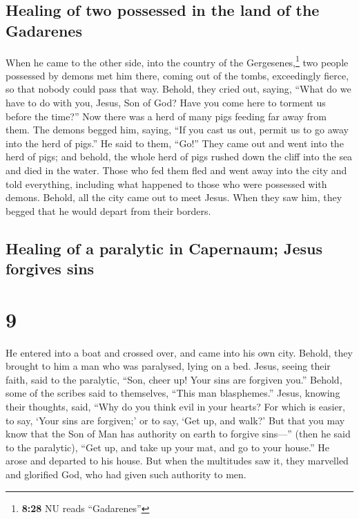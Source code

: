 \hypertarget{healing-of-two-possessed-in-the-land-of-the-gadarenes}{%
\subsection{Healing of two possessed in the land of the
Gadarenes}\label{healing-of-two-possessed-in-the-land-of-the-gadarenes}}

 When he came to the other side, into the country of the
Gergesenes,\footnote{\textbf{8:28} NU reads ``Gadarenes''} two people
possessed by demons met him there, coming out of the tombs, exceedingly
fierce, so that nobody could pass that way.  Behold, they
cried out, saying, ``What do we have to do with you, Jesus, Son of God?
Have you come here to torment us before the time?''  Now
there was a herd of many pigs feeding far away from them.
 The demons begged him, saying, ``If you cast us out,
permit us to go away into the herd of pigs.''  He said to
them, ``Go!'' They came out and went into the herd of pigs; and behold,
the whole herd of pigs rushed down the cliff into the sea and died in
the water.  Those who fed them fled and went away into
the city and told everything, including what happened to those who were
possessed with demons.  Behold, all the city came out to
meet Jesus. When they saw him, they begged that he would depart from
their borders.

\hypertarget{healing-of-a-paralytic-in-capernaum-jesus-forgives-sins}{%
\subsection{Healing of a paralytic in Capernaum; Jesus forgives
sins}\label{healing-of-a-paralytic-in-capernaum-jesus-forgives-sins}}

\hypertarget{section-8}{%
\section{9}\label{section-8}}

 He entered into a boat and crossed over, and came into
his own city.  Behold, they brought to him a man who was
paralysed, lying on a bed. Jesus, seeing their faith, said to the
paralytic, ``Son, cheer up! Your sins are forgiven you.'' 
Behold, some of the scribes said to themselves, ``This man blasphemes.''
 Jesus, knowing their thoughts, said, ``Why do you think
evil in your hearts?  For which is easier, to say, `Your
sins are forgiven;' or to say, `Get up, and walk?'  But
that you may know that the Son of Man has authority on earth to forgive
sins---'' (then he said to the paralytic), ``Get up, and take up your
mat, and go to your house.''  He arose and departed to his
house.  But when the multitudes saw it, they marvelled and
glorified God, who had given such authority to men.

